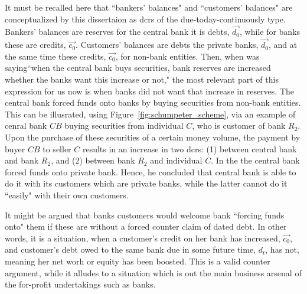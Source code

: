 It must be recalled here that ``bankers' balances" and ``customers' balances" are conceptualized by this dissertaion as \acfp{dcr} of the due-today-continuously type. Bankers' balances are reserves for the central bank it is debts, $\overrightarrow{d_0}$, while for banks these are credits, $\overrightarrow{c_0}$. Customers' balances are debts the private banks, $\overrightarrow{d_0}$, and at the same time these credits, $\overrightarrow{c_0}$, for non-bank entities. Then, when \citeauthor{schumpeter2014} was saying``when the central bank buys securities, bank reserves are increased whether the banks want this increase or not," the most relevant part of this expression for us now is when banks did not want that increase in reserves. The central bank forced funds onto banks by buying securities from non-bank entities. This can be illusrated, using Figure~\ref{fig:schumpeter_scheme}, via an example of cenral bank $CB$ buying securities from individual $C$, who is customer of bank $R_2$. Upon the purchase of these securities of a certain money volume, the payment by buyer $CB$ to seller $C$ results in an increase in two \acfp{dcr}: (1) between central bank and bank $R_2$, and (2) between bank $R_2$ and individual $C$. In the \citeauthor{schumpeter2014} the central bank forced funds onto private bank. Hence, he concluded that central bank is able to do it with its customers which are private banks, while the latter cannot do it ``easily" with their own customers. 

It might be argued that banks customers would welcome bank ``forcing funds onto" them if these are without a forced counter claim of dated debt. In other words, it is a situation, when a customer's credit on her bank has increased, $\overrightarrow{c_0}$, and customer's debt owed to the same bank due in some future time, $d_t$, has not, meaning her net worh or equity has been boosted. This is a valid counter argument, while it alludes to a situation which is out the main business arsenal of the for-profit undertakings such as banks. 

